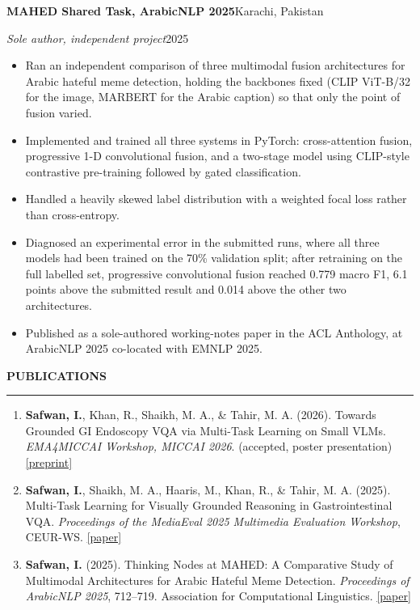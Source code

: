 \documentclass[11pt,letterpaper]{article}
\newcommand{\cvsection}[1]{%
  \Needspace*{6\baselineskip}%
  \vspace{1.0em}%
  {\bfseries\uppercase{#1}}\par
  \vspace{0.15em}\hrule\vspace{0.5em}%
}
\newenvironment{entrybox}
  {\par\vspace{0.5em}\noindent\begin{minipage}{\linewidth}}
  {\end{minipage}\par}
\newcommand{\orgline}[2]{\textbf{#1}\hfill #2\par}
\newcommand{\roleline}[2]{\textit{#1}\hfill #2\par\vspace{0.15em}}
\begin{document}
\begin{entrybox}
  \orgline{MAHED Shared Task, ArabicNLP 2025}{Karachi, Pakistan}
  \roleline{Sole author, independent project}{2025}
  \begin{itemize}
    \item Ran an independent comparison of three multimodal fusion architectures for Arabic
          hateful meme detection, holding the backbones fixed (CLIP ViT-B/32 for the image,
          MARBERT for the Arabic caption) so that only the point of fusion varied.
    \item Implemented and trained all three systems in PyTorch: cross-attention fusion,
          progressive 1-D convolutional fusion, and a two-stage model using CLIP-style contrastive
          pre-training followed by gated classification.
    \item Handled a heavily skewed label distribution with a weighted focal loss rather than
          cross-entropy.
    \item Diagnosed an experimental error in the submitted runs, where all three models had been
          trained on the 70\% validation split; after retraining on the full labelled set,
          progressive convolutional fusion reached 0.779 macro F1, 6.1 points above the submitted
          result and 0.014 above the other two architectures.
    \item Published as a sole-authored working-notes paper in the ACL Anthology, at ArabicNLP 2025
          co-located with EMNLP 2025.
  \end{itemize}
\end{entrybox}

\cvsection{Publications}

\begin{entrybox}
\begin{enumerate}[leftmargin=1.6em, topsep=2pt, itemsep=5pt, parsep=0pt]
  \item \textbf{Safwan, I.}, Khan, R., Shaikh, M. A., \& Tahir, M. A. (2026). Towards Grounded GI
        Endoscopy VQA via Multi-Task Learning on Small VLMs. \textit{EMA4MICCAI Workshop, MICCAI
        2026}. (accepted, poster presentation)
        \href{https://arxiv.org/pdf/2607.27122}{[preprint]}
  \item \textbf{Safwan, I.}, Shaikh, M. A., Haaris, M., Khan, R., \& Tahir, M. A. (2025).
        Multi-Task Learning for Visually Grounded Reasoning in Gastrointestinal VQA.
        \textit{Proceedings of the MediaEval 2025 Multimedia Evaluation Workshop}, CEUR-WS.
        \href{https://arxiv.org/pdf/2511.04384}{[paper]}
  \item \textbf{Safwan, I.} (2025). Thinking Nodes at MAHED: A Comparative Study of Multimodal
        Architectures for Arabic Hateful Meme Detection. \textit{Proceedings of ArabicNLP 2025},
        712--719. Association for Computational Linguistics.
        \href{https://aclanthology.org/2025.arabicnlp-sharedtasks.98.pdf}{[paper]}
\end{enumerate}
\end{entrybox}
\end{document}

